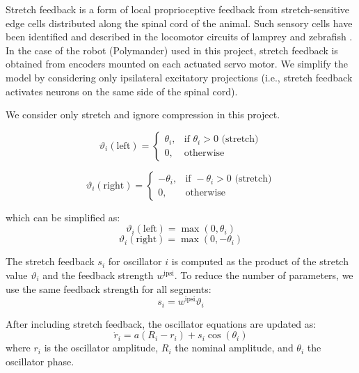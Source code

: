 \documentclass{cmc}
\begin{document}
Stretch feedback is a form of local proprioceptive feedback from stretch-sensitive edge cells distributed along the spinal cord of the animal. Such sensory cells have been identified and described in the locomotor circuits of lamprey \cite{grillner1984edge} and zebrafish \cite{picton_spinal_2021}. In the case of the robot (Polymander) used in this project, stretch feedback is obtained from encoders mounted on each actuated servo motor. We simplify the model by considering only ipsilateral excitatory projections (i.e., stretch feedback activates neurons on the same side of the spinal cord).

We consider only stretch and ignore compression in this project.

\begin{equation}
  \label{eq:vartheta1}
  \vartheta_i(\text{left}) =
  \begin{cases}
    \theta_i, & \text{if } \theta_i > 0 \text{ (stretch)} \\
    0, & \text{otherwise}
  \end{cases}
\end{equation}

\begin{equation}
  \label{eq:vartheta2}
  \vartheta_i(\text{right}) =
  \begin{cases}
    -\theta_i, & \text{if } -\theta_i > 0 \text{ (stretch)} \\
    0, & \text{otherwise}
  \end{cases}
\end{equation}

which can be simplified as:
\begin{equation}
 \vartheta_i(\text{left}) = \max(0, \theta_i)
\end{equation}
\begin{equation}
  \vartheta_i(\text{right}) = \max(0, -\theta_i)
\end{equation}

The stretch feedback $s_i$ for oscillator $i$ is computed as the product of the stretch value $\vartheta_i$ and the feedback strength $w^{\text{ipsi}}$. To reduce the number of parameters, we use the same feedback strength for all segments:
\begin{equation}
  s_i = w^{\text{ipsi}} \vartheta_i
\end{equation}

After including stretch feedback, the oscillator equations are updated as:
\begin{equation}
  \dot{r}_i = a(R_i - r_i) + s_i \cos(\theta_i)
\end{equation}
where $r_i$ is the oscillator amplitude, $R_i$ the nominal amplitude, and $\theta_i$ the oscillator phase.
\end{document}
